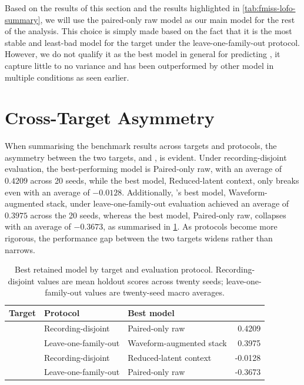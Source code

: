 Based on the results of this section and the results highlighted in \cref{tab:fmiss-lofo-summary}, we will use the paired-only raw model as our main model for the rest of the analysis. This choice is simply made based on the fact that it is the most stable and least-bad model for the \fmiss{} target under the leave-one-family-out protocol. However, we do not qualify it as the best model in general for predicting \fmiss{}, it capture little to no variance and has been outperformed by other model in multiple conditions as seen earlier.

\section{Cross-Target Asymmetry}

When summarising the benchmark results across targets and protocols, the asymmetry between the two targets, \fpos{} and \fmiss{}, is evident. Under recording-disjoint evaluation, the best-performing \fpos{} model is Paired-only raw, with an average \rsq{} of $0.4209$ across 20 seeds, while the best \fmiss{} model, Reduced-latent context, only breaks even with an average \rsq{} of $-0.0128$. Additionally, \fpos{}'s best model, Waveform-augmented stack, under leave-one-family-out evaluation achieved an average \rsq{} of $0.3975$ across the 20 seeds, whereas the best \fmiss{} model, Paired-only raw, collapses with an average \rsq{} of $-0.3673$, as summarised in \cref{tab:target-protocol-summary}. As protocols become more rigorous, the performance gap between the two targets widens rather than narrows.

\begin{table}[H]
    \centering
    \caption{Best retained model by target and evaluation protocol. Recording-disjoint values are mean holdout scores across twenty seeds; leave-one-family-out values are twenty-seed macro averages.}
    \label{tab:target-protocol-summary}
    \small
    \begin{tabular}{lllr}
        \toprule
        Target & Protocol & Best model & \rsq{} \\
        \midrule
        \fpos{} & Recording-disjoint & Paired-only raw & 0.4209 \\
        \fpos{} & Leave-one-family-out & Waveform-augmented stack & 0.3975 \\
        \fmiss{} & Recording-disjoint & Reduced-latent context & -0.0128 \\
        \fmiss{} & Leave-one-family-out & Paired-only raw & -0.3673 \\
        \bottomrule
    \end{tabular}
\end{table}

